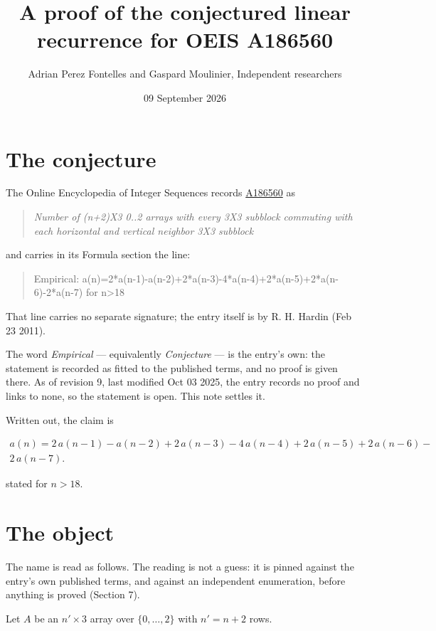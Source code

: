 \documentclass[11pt]{article}
\title{A proof of the conjectured linear recurrence for OEIS A186560}
\author{Adrian Perez Fontelles and Gaspard Moulinier, Independent researchers}
\date{09 September 2026}
\theoremstyle{definition}
\begin{document}
\maketitle
\section{The conjecture}

The Online Encyclopedia of Integer Sequences records \href{https://oeis.org/A186560}{A186560} as

\begin{quote}\itshape Number of (n+2)X3 0..2 arrays with every 3X3 subblock commuting with each horizontal and vertical neighbor 3X3 subblock\end{quote}

and carries in its Formula section the line:

\begin{quote}\ttfamily Empirical: a(n)=2*a(n-1)-a(n-2)+2*a(n-3)-4*a(n-4)+2*a(n-5)+2*a(n-6)-2*a(n-7) for n>18\end{quote}

That line carries no separate signature; the entry itself is by R. H. Hardin (Feb 23 2011).

The word {\itshape Empirical} --- equivalently {\itshape Conjecture} --- is the entry's own: the statement is recorded as fitted to the published terms, and no proof is given there. As of revision 9, last modified Oct 03 2025, the entry records no proof and links to none, so the statement is open. This note settles it.

Written out, the claim is

\begin{multline*} a(n) = 2\,a(n-1) - a(n-2) + 2\,a(n-3) - 4\,a(n-4) + 2\,a(n-5) + 2\,a(n-6) - \\ 2\,a(n-7). \end{multline*}

stated for $n > 18$.

\section{The object}

The name is read as follows. The reading is not a guess: it is pinned against the entry's own published terms, and against an independent enumeration, before anything is proved (Section 7).

Let $A$ be an $n' \times 3$ array over $\{0,\dots,2\}$ with $n' = n + 2$ rows.
\end{document}
